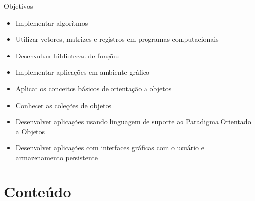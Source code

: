 \documentclass{beamer}
\begin{document}
\begin{frame}{Objetivos}
    \begin{itemize}
        \item Implementar algoritmos
        \item Utilizar vetores, matrizes e registros em programas computacionais
        \item Desenvolver bibliotecas de funções
        \item Implementar aplicações em ambiente gráfico
        \item Aplicar os conceitos básicos de orientação a objetos
        \item Conhecer as coleções de objetos
        \item Desenvolver aplicações usando linguagem de suporte ao Paradigma Orientado a Objetos
        \item Desenvolver aplicações com interfaces gráficas com o usuário e armazenamento persistente
    \end{itemize}
\end{frame}

\section{Conteúdo}
\end{document}
